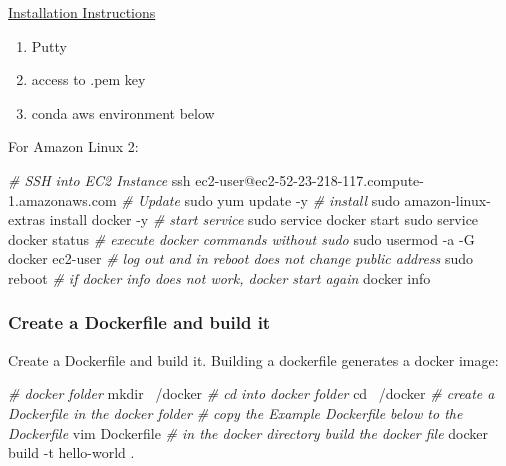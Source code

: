 \documentclass[
]{book}
\newenvironment{Shaded}{\begin{snugshade}}{\end{snugshade}}
\newcommand{\BuiltInTok}[1]{#1}
\newcommand{\CommentTok}[1]{\textcolor[rgb]{0.56,0.35,0.01}{\textit{#1}}}
\newcommand{\ExtensionTok}[1]{#1}
\newcommand{\FunctionTok}[1]{\textcolor[rgb]{0.00,0.00,0.00}{#1}}
\newcommand{\NormalTok}[1]{#1}
\providecommand{\tightlist}{%
  \setlength{\itemsep}{0pt}\setlength{\parskip}{0pt}}
\begin{document}
\href{https://docs.aws.amazon.com/AmazonECS/latest/developerguide/docker-basics.html}{Installation Instructions}

\begin{enumerate}
\def\labelenumi{\arabic{enumi}.}
\tightlist
\item
  Putty
\item
  access to .pem key
\item
  conda aws environment below
\end{enumerate}

For Amazon Linux 2:

\begin{Shaded}
\begin{Highlighting}[]
\CommentTok{# SSH into EC2 Instance}
\FunctionTok{ssh}\NormalTok{ ec2-user@ec2-52-23-218-117.compute-1.amazonaws.com}
\CommentTok{# Update}
\FunctionTok{sudo}\NormalTok{ yum update -y}
\CommentTok{# install}
\FunctionTok{sudo}\NormalTok{ amazon-linux-extras install docker -y}
\CommentTok{# start service}
\FunctionTok{sudo}\NormalTok{ service docker start}
\FunctionTok{sudo}\NormalTok{ service docker status}
\CommentTok{# execute docker commands without sudo}
\FunctionTok{sudo}\NormalTok{ usermod -a -G docker ec2-user}
\CommentTok{# log out and in reboot does not change public address}
\FunctionTok{sudo}\NormalTok{ reboot}
\CommentTok{# if docker info does not work, docker start again}
\ExtensionTok{docker}\NormalTok{ info}
\end{Highlighting}
\end{Shaded}

\hypertarget{create-a-dockerfile-and-build-it}{%
\subsubsection{Create a Dockerfile and build it}\label{create-a-dockerfile-and-build-it}}

Create a Dockerfile and build it. Building a dockerfile generates a docker image:

\begin{Shaded}
\begin{Highlighting}[]
\CommentTok{# docker folder}
\FunctionTok{mkdir}\NormalTok{ ~/docker}
\CommentTok{# cd into docker folder}
\BuiltInTok{cd}\NormalTok{ ~/docker}
\CommentTok{# create a Dockerfile in the docker folder}
\CommentTok{# copy the Example Dockerfile below to the Dockerfile}
\ExtensionTok{vim}\NormalTok{ Dockerfile}
\CommentTok{# in the docker directory build the docker file}
\ExtensionTok{docker}\NormalTok{ build -t hello-world .}
\end{Highlighting}
\end{Shaded}
\end{document}
